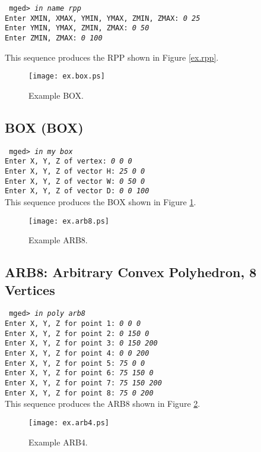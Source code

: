 {\tt
mged> {\em in name rpp}\\
Enter XMIN, XMAX, YMIN, YMAX, ZMIN, ZMAX: {\em 0 25} \\
Enter YMIN, YMAX, ZMIN, ZMAX: {\em 0 50} \\
Enter ZMIN, ZMAX: {\em 0 100} \\
}

This sequence produces the RPP shown in Figure \ref{ex.rpp}.

\begin{figure}
\centering \texttt{[image: ex.box.ps]}
\caption{Example BOX.}
\label{ex.box}
\end{figure}

\subsection{BOX (BOX)}

{\tt
mged> {\em in my box} \\
Enter X, Y, Z of vertex: {\em 0 0 0} \\
Enter X, Y, Z of vector H: {\em 25 0 0} \\
Enter X, Y, Z of vector W: {\em 0 50 0} \\
Enter X, Y, Z of vector D: {\em 0 0 100} \\
}
This sequence produces the BOX shown in Figure \ref{ex.box}.

\begin{figure}
\centering \texttt{[image: ex.arb8.ps]}
\caption{Example ARB8.}
\label{ex.arb8}
\end{figure}

\subsection{ARB8: Arbitrary Convex Polyhedron, 8 Vertices}

{\tt
mged> {\em in poly arb8} \\
Enter X, Y, Z for point 1: {\em 0 0 0} \\
Enter X, Y, Z for point 2: {\em 0 150 0} \\
Enter X, Y, Z for point 3: {\em 0 150 200} \\
Enter X, Y, Z for point 4: {\em 0 0 200} \\
Enter X, Y, Z for point 5: {\em 75 0 0} \\
Enter X, Y, Z for point 6: {\em 75 150 0} \\
Enter X, Y, Z for point 7: {\em 75 150 200} \\
Enter X, Y, Z for point 8: {\em 75 0 200} \\
}
This sequence produces the ARB8 shown in Figure \ref{ex.arb8}.
\begin{figure}
\centering \texttt{[image: ex.arb4.ps]}
\caption{Example ARB4.}
\label{ex.arb4}
\end{figure}


